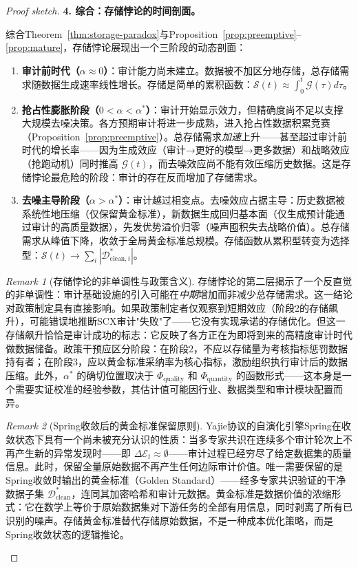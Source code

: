 \documentclass[12pt,a4paper]{ctexart}
\theoremstyle{definition}
\theoremstyle{remark}
\newtheorem{remark}{Remark}[section]
\begin{document}
\begin{proof}[Proof sketch]
\medskip
\noindent\textbf{4. 综合：存储悖论的时间剖面。}

综合Theorem~\ref{thm:storage-paradox}与Proposition~\ref{prop:preemptive}–\ref{prop:mature}，存储悖论展现出一个三阶段的动态剖面：

\begin{enumerate}[label=\textbf{阶段 \arabic*}:, leftmargin=*]
\item \textbf{审计前时代（$\alpha \approx 0$）}：审计能力尚未建立。数据被不加区分地存储，总存储需求随数据生成速率线性增长。存储是简单的累积函数：$\mathcal{S}(t) \approx \int_0^t \mathcal{G}(\tau) d\tau$。

\item \textbf{抢占性膨胀阶段（$0 < \alpha < \alpha^*$）}：审计开始显示效力，但精确度尚不足以支撑大规模去噪决策。各方预期审计将进一步成熟，进入抢占性数据积累竞赛（Proposition~\ref{prop:preemptive}）。总存储需求\textit{加速}上升——甚至超过审计前时代的增长率——因为生成效应（审计→更好的模型→更多数据）和战略效应（抢跑动机）同时推高 $\mathcal{G}(t)$，而去噪效应尚不能有效压缩历史数据。这是存储悖论最危险的阶段：审计的存在反而增加了存储需求。

\item \textbf{去噪主导阶段（$\alpha > \alpha^*$）}：审计越过相变点。去噪效应占据主导：历史数据被系统性地压缩（仅保留黄金标准），新数据生成回归基本面（仅生成预计能通过审计的高质量数据），先发优势溢价归零（噪声囤积失去战略价值）。总存储需求从峰值下降，收敛于全局黄金标准总规模。存储函数从累积型转变为选择型：$\mathcal{S}(t) \to \sum_i |\mathcal{D}_{\text{clean}, i}^*|$。
\end{enumerate}

\begin{remark}[存储悖论的非单调性与政策含义]
存储悖论的第二层揭示了一个反直觉的非单调性：审计基础设施的引入可能在\textit{中期}增加而非减少总存储需求。这一结论对政策制定具有直接影响。如果政策制定者仅观察到短期效应（阶段2的存储飙升），可能错误地推断SCX审计"失败"了——它没有实现承诺的存储优化。但这一存储飙升恰恰是审计成功的标志：它反映了各方正在为即将到来的高精度审计时代做数据储备。政策干预应区分阶段：在阶段2，不应以存储量为考核指标惩罚数据持有者；在阶段3，应以黄金标准采纳率为核心指标，激励组织执行审计后的数据压缩。此外，$\alpha^*$ 的确切位置取决于 $\Phi_{\text{quality}}$ 和 $\Phi_{\text{quantity}}$ 的函数形式——这本身是一个需要实证校准的经验参数，其估计值可能因行业、数据类型和审计模块配置而异。
\end{remark}

\begin{remark}[Spring收敛后的黄金标准保留原则]
\label{rem:golden-standard}
Yajie协议的自演化引擎Spring在收敛状态下具有一个尚未被充分认识的性质：当多专家共识在连续多个审计轮次上不再产生新的异常发现时——即 $\Delta\mathcal{E}_t \approx \emptyset$——审计过程已经穷尽了给定数据集的质量信息。此时，保留全量原始数据不再产生任何边际审计价值。唯一需要保留的是Spring收敛时输出的黄金标准（Golden Standard）——经多专家共识验证的干净数据子集 $\mathcal{D}_{\text{clean}}^*$，连同其加密哈希和审计元数据。黄金标准是数据价值的浓缩形式：它在数学上等价于原始数据集对下游任务的全部有用信息，同时剥离了所有已识别的噪声。存储黄金标准替代存储原始数据，不是一种成本优化策略，而是Spring收敛状态的逻辑推论。
\end{remark}


\end{proof}
\end{document}
